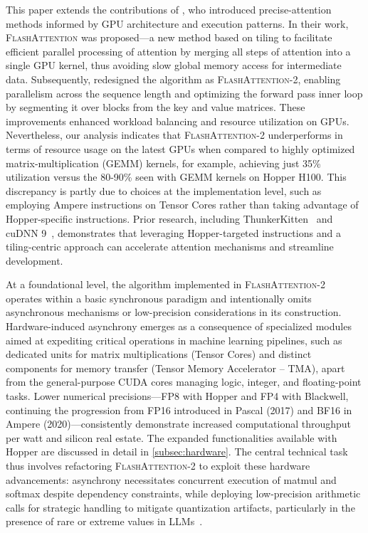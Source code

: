 This paper extends the contributions of \citet{dao2022flashattention}, who introduced precise-attention methods informed by GPU architecture and execution patterns. In their work, \textsc{FlashAttention} was proposed—a new method based on tiling to facilitate efficient parallel processing of attention by merging all steps of attention into a single GPU kernel, thus avoiding slow global memory access for intermediate data. Subsequently, \citet{dao2023flashattention2} redesigned the algorithm as \textsc{FlashAttention-2}, enabling parallelism across the sequence length and optimizing the forward pass inner loop by segmenting it over blocks from the key and value matrices. These improvements enhanced workload balancing and resource utilization on GPUs. Nevertheless, our analysis indicates that \textsc{FlashAttention-2} underperforms in terms of resource usage on the latest GPUs when compared to highly optimized matrix-multiplication (GEMM) kernels, for example, achieving just 35\% utilization versus the 80-90\% seen with GEMM kernels on Hopper H100. This discrepancy is partly due to choices at the implementation level, such as employing Ampere instructions on Tensor Cores rather than taking advantage of Hopper-specific instructions. Prior research, including ThunkerKitten~\citep{spector2024thunder} and cuDNN 9~\citep{cudnn9}, demonstrates that leveraging Hopper-targeted instructions and a tiling-centric approach can accelerate attention mechanisms and streamline development.

At a foundational level, the algorithm implemented in \textsc{FlashAttention-2} operates within a basic synchronous paradigm and intentionally omits asynchronous mechanisms or low-precision considerations in its construction. Hardware-induced asynchrony emerges as a consequence of specialized modules aimed at expediting critical operations in machine learning pipelines, such as dedicated units for matrix multiplications (Tensor Cores) and distinct components for memory transfer (Tensor Memory Accelerator -- TMA), apart from the general-purpose CUDA cores managing logic, integer, and floating-point tasks. Lower numerical precisions—FP8 with Hopper and FP4 with Blackwell, continuing the progression from FP16 introduced in Pascal (2017) and BF16 in Ampere (2020)—consistently demonstrate increased computational throughput per watt and silicon real estate. The expanded functionalities available with Hopper are discussed in detail in \cref{subsec:hardware}. The central technical task thus involves refactoring \textsc{FlashAttention-2} to exploit these hardware advancements: asynchrony necessitates concurrent execution of matmul and softmax despite dependency constraints, while deploying low-precision arithmetic calls for strategic handling to mitigate quantization artifacts, particularly in the presence of rare or extreme values in LLMs~\citep{dettmers2208llm, sun2024massive}.

